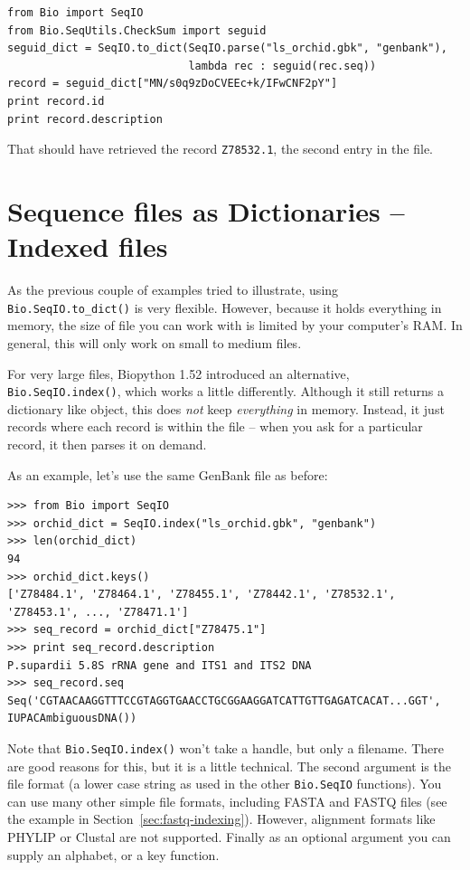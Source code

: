 \documentclass{report}
\begin{document}
\begin{verbatim}
from Bio import SeqIO
from Bio.SeqUtils.CheckSum import seguid
seguid_dict = SeqIO.to_dict(SeqIO.parse("ls_orchid.gbk", "genbank"),
                            lambda rec : seguid(rec.seq))
record = seguid_dict["MN/s0q9zDoCVEEc+k/IFwCNF2pY"]
print record.id
print record.description
\end{verbatim}

\noindent That should have retrieved the record {\tt Z78532.1}, the second entry in the file.

\section{Sequence files as Dictionaries -- Indexed files}
\label{sec:SeqIO-index}

As the previous couple of examples tried to illustrate, using
\verb|Bio.SeqIO.to_dict()| is very flexible. However, because it holds
everything in memory, the size of file you can work with is limited by your
computer's RAM. In general, this will only work on small to medium files.

For very large files, Biopython 1.52 introduced an alternative,
\verb|Bio.SeqIO.index()|, which works a little differently. Although
it still returns a dictionary like object, this does \emph{not} keep
\emph{everything} in memory. Instead, it just records where each record
is within the file -- when you ask for a particular record, it then parses
it on demand.

As an example, let's use the same GenBank file as before:

\begin{verbatim}
>>> from Bio import SeqIO
>>> orchid_dict = SeqIO.index("ls_orchid.gbk", "genbank")
>>> len(orchid_dict)
94
>>> orchid_dict.keys()
['Z78484.1', 'Z78464.1', 'Z78455.1', 'Z78442.1', 'Z78532.1', 'Z78453.1', ..., 'Z78471.1']
>>> seq_record = orchid_dict["Z78475.1"]
>>> print seq_record.description
P.supardii 5.8S rRNA gene and ITS1 and ITS2 DNA
>>> seq_record.seq
Seq('CGTAACAAGGTTTCCGTAGGTGAACCTGCGGAAGGATCATTGTTGAGATCACAT...GGT', IUPACAmbiguousDNA())
\end{verbatim}

\noindent Note that \verb|Bio.SeqIO.index()| won't take a handle,
but only a filename. There are good reasons for this, but it is a little
technical. The second argument is the file format (a lower case string as
used in the other \verb|Bio.SeqIO| functions). You can use many other
simple file formats, including FASTA and FASTQ files (see the example in
Section~\ref{sec:fastq-indexing}). However, alignment
formats like PHYLIP or Clustal are not supported. Finally as an optional
argument you can supply an alphabet, or a key function.
\end{document}
